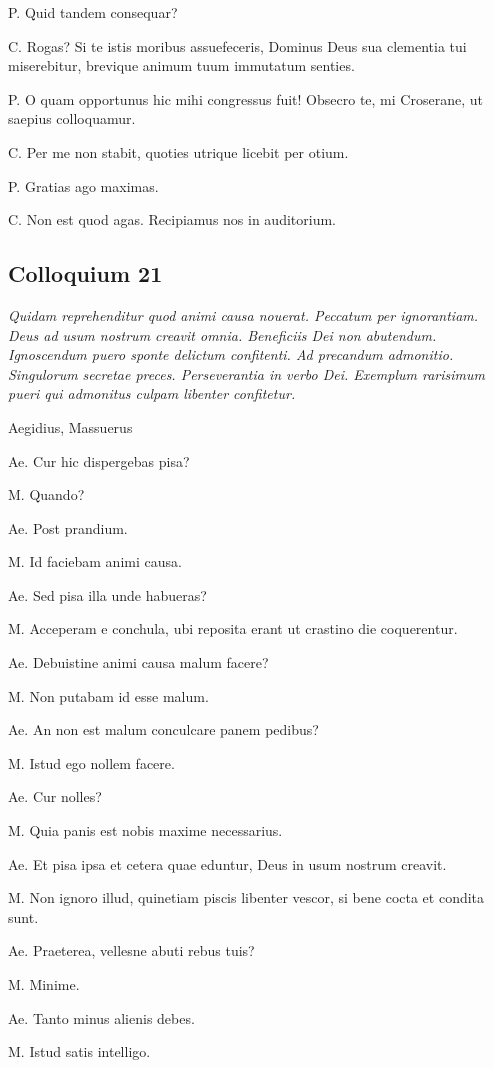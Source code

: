 \documentclass{article}
\begin{document}
P. Quid tandem consequar?

C. Rogas? Si te istis moribus assuefeceris, Dominus Deus sua clementia tui miserebitur, brevique animum tuum immutatum senties.

P. O quam opportunus hic mihi congressus fuit! Obsecro te, mi Croserane, ut saepius colloquamur.

C. Per me non stabit, quoties utrique licebit per otium.

P. Gratias ago maximas.

C. Non est quod agas. Recipiamus nos in auditorium.

\subsection{Colloquium 21}
\emph{Quidam reprehenditur quod animi causa nouerat. Peccatum per ignorantiam. Deus ad usum nostrum creavit omnia. Beneficiis Dei non abutendum. Ignoscendum puero sponte delictum confitenti. Ad precandum admonitio. Singulorum secretae preces. Perseverantia in verbo Dei. Exemplum rarisimum pueri qui admonitus culpam libenter confitetur.}

Aegidius, Massuerus

Ae. Cur hic dispergebas pisa?

M. Quando?

Ae. Post prandium.

M. Id faciebam animi causa.

Ae. Sed pisa illa unde habueras?

M. Acceperam e conchula, ubi reposita erant ut crastino die coquerentur.

Ae. Debuistine animi causa malum facere?

M. Non putabam id esse malum.

Ae. An non est malum conculcare panem pedibus?

M. Istud ego nollem facere.

Ae. Cur nolles?

M. Quia panis est nobis maxime necessarius.

Ae. Et pisa ipsa et cetera quae eduntur, Deus in usum nostrum creavit.

M. Non ignoro illud, quinetiam piscis libenter vescor, si bene cocta et condita sunt.

Ae. Praeterea, vellesne abuti rebus tuis?

M. Minime.

Ae. Tanto minus alienis debes.

M. Istud satis intelligo.
\end{document}
